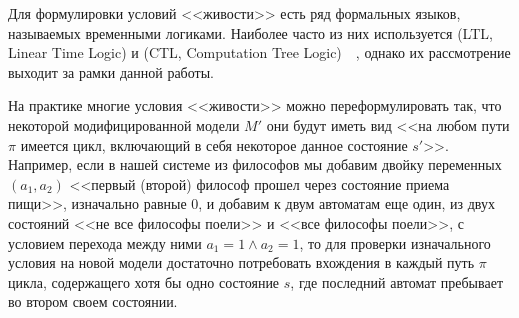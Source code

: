 Для формулировки условий <<живости>> есть ряд формальных языков, называемых временными
логиками. Наиболее часто из них используется  (LTL, Linear
Time Logic) и  (CTL, Computation Tree
Logic)~\cite{Clarke}~\cite{Velder}, однако их рассмотрение выходит за рамки данной
работы.

На практике многие условия <<живости>> можно переформулировать так, что некоторой
модифицированной модели $M'$ они будут иметь вид <<на любом пути $\pi$ имеется цикл,
включающий в себя некоторое данное состояние $s'$>>. Например, если в нашей системе из
философов мы добавим двойку переменных $(a_1, a_2)$ <<первый (второй) философ прошел через
состояние приема пищи>>, изначально равные $0$, и добавим к двум автоматам еще один, из
двух состояний <<не все философы поели>> и <<все философы поели>>, с условием перехода
между ними $a_1 = 1 \wedge a_2 = 1$, то для проверки изначального условия на новой модели
достаточно потребовать вхождения в каждый путь $\pi$ цикла, содержащего хотя бы одно
состояние $s$, где последний автомат пребывает во втором своем состоянии.

